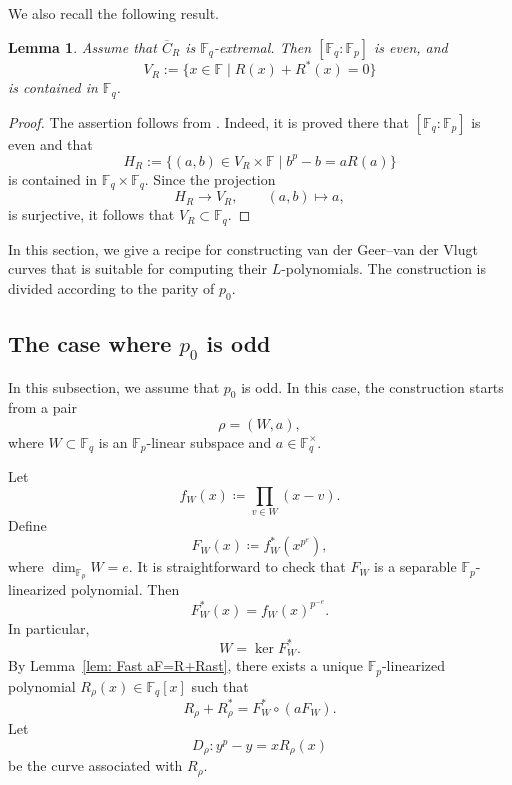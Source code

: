 \documentclass[12pt,a4paper]{amsart}
\newtheorem{lemma}[theorem]{Lemma}
\theoremstyle{definition}
\def\F{{\mathbb F}}
\theoremstyle{remark}
\begin{document}
We also recall the following result. 
\begin{lemma}\label{lemma: When CR is extremal Fq Fp is even and VR in Fq}
Assume that $\overline{C}_R$ is $\F_q$-extremal. Then $[\F_q:\F_p]$ is even, and  
\begin{equation}\label{vr}
V_R:=\{x\in \F\mid R(x)+R^\ast(x)=0\}
\end{equation}
 is contained in $\F_q$.    
\end{lemma}
\begin{proof}
The assertion follows from \cite[Lemma~A.3]{ITT1}. Indeed, it is proved there that
$[\F_q:\F_p]$ is even and that
\[
H_R :=\{(a,b)\in V_R\times \F\mid b^p-b=aR(a)\}
\]
is contained in $\F_q\times \F_q$.
Since the projection
\[
H_R\to V_R,\qquad (a,b)\mapsto a,
\]
is surjective, it follows that $V_R\subset \F_q$.
\end{proof}


In this section, we give a recipe for constructing van der Geer--van der Vlugt curves that is suitable for computing their $L$-polynomials. The construction is divided according to the parity of $p_0$. 



\subsection{The case where $p_0$ is odd}\label{ssec: The case where p0 is odd}
In this subsection, we assume that $p_0$ is odd. In this case, the construction starts from a pair 
\[\rho=(W,a),\]
where $W\subset \F_q$ is an $\F_p$-linear subspace and $a\in \F_q^\times$. 

Let 
\[
f_W(x)\coloneqq\prod_{v\in W}(x-v).  
\]
Define 
\begin{equation}\label{fwd}
F_W(x)\coloneqq f_W^\ast(x^{p^e}), 
\end{equation}
where $\dim_{\F_p}W=e$. 
It is straightforward to check that $F_W$ is a separable $\F_p$-linearized polynomial. 
Then
\[
F_W^\ast(x)=f_W(x)^{p^{-e}}.
\]
In particular,
\[
W=\ker F_W^\ast.
\]
By Lemma~\ref{lem: Fast aF=R+Rast}, there exists a unique $\F_p$-linearized polynomial $R_\rho(x) \in \F_q[x]$ 
such that 
\[R_\rho+R_\rho^\ast=F_W^\ast \circ (a F_W).\]
Let
\[
D_{\rho}\colon y^p-y=xR_\rho(x)
\]
be the curve associated with $R_\rho$. 
  
\end{document}
